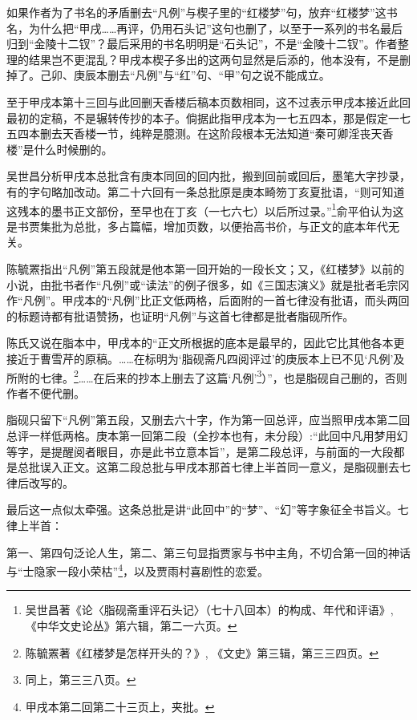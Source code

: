 \par 如果作者为了书名的矛盾删去“凡例”与楔子里的“红楼梦”句，放弃“红楼梦”这书名，为什么把“甲戌……再评，仍用石头记”这句也删了，以至于一系列的书名最后归到“金陵十二钗”？最后采用的书名明明是“石头记”，不是“金陵十二钗”。作者整理的结果岂不更混乱？甲戌本楔子多出的这两句显然是后添的，他本没有，不是删掉了。己卯、庚辰本删去“凡例”与“红”句、“甲”句之说不能成立。
\par 至于甲戌本第十三回与此回删天香楼后稿本页数相同，这不过表示甲戌本接近此回最初的定稿，不是辗转传抄的本子。倘据此指甲戌本为一七五四本，那是假定一七五四本删去天香楼一节，纯粹是臆测。在这阶段根本无法知道“秦可卿淫丧天香楼”是什么时候删的。
\par 吴世昌分析甲戌本总批含有庚本同回的回内批，搬到回前或回后，墨笔大字抄录，有的字句略加改动。第二十六回有一条总批原是庚本畸笏丁亥夏批语，“则可知道这残本的墨书正文部份，至早也在丁亥（一七六七）以后所过录。”\footnote{吴世昌著《论〈脂砚斋重评石头记〉（七十八回本）的构成、年代和评语》, 《中华文史论丛》第六辑，第二一六页。}俞平伯认为这是书贾集批为总批，多占篇幅，增加页数，以便抬高书价，与正文的底本年代无关。
\par 陈毓罴指出“凡例”第五段就是他本第一回开始的一段长文；又，《红楼梦》以前的小说，由批书者作“凡例”或“读法”的例子很多，如《三国志演义》就是批者毛宗冈作“凡例”。甲戌本的“凡例”比正文低两格，后面附的一首七律没有批语，而头两回的标题诗都有批语赞扬，也证明“凡例”与这首七律都是批者脂砚所作。
\par 陈氏又说在脂本中，甲戌本的“正文所根据的底本是最早的，因此它比其他各本更接近于曹雪芹的原稿。……在标明为‘脂砚斋凡四阅评过’的庚辰本上已不见‘凡例’及所附的七律。\footnote{陈毓罴著《红楼梦是怎样开头的？》, 《文史》第三辑，第三三四页。}……在后来的抄本上删去了这篇‘凡例’\footnote{同上，第三三八页。}）”，也是脂砚自己删的，否则作者不便代删。
\par 脂砚只留下“凡例”第五段，又删去六十字，作为第一回总评，应当照甲戌本第二回总评一样低两格。庚本第一回第二段（全抄本也有，未分段）:“此回中凡用梦用幻等字，是提醒阅者眼目，亦是此书立意本旨”，是第二段总评，与前面的一大段都是总批误入正文。这第二段总批与甲戌本那首七律上半首同一意义，是脂砚删去七律后改写的。
\par 最后这一点似太牵强。这条总批是讲“此回中”的“梦”、“幻”等字象征全书旨义。七律上半首：
\par 第一、第四句泛论人生，第二、第三句显指贾家与书中主角，不切合第一回的神话与“士隐家一段小荣枯”\footnote{甲戌本第二回第二十三页上，夹批。}，以及贾雨村喜剧性的恋爱。
